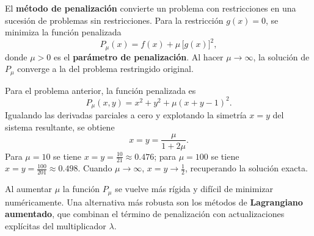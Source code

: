 \documentclass[a4,11pt]{aleph-notas}
\begin{document}
\begin{defi}
    El \textbf{método de penalización} convierte un problema con restricciones en una sucesión de problemas sin restricciones. Para la restricción $g({x})=0$, se minimiza la función penalizada
    \[
        P_\mu({x})=f({x})+\mu\,\bigl[g({x})\bigr]^2,
    \]
    donde $\mu>0$ es el \textbf{parámetro de penalización}. Al hacer $\mu\to\infty$, la solución de $P_\mu$ converge a la del problema restringido original.
\end{defi}

\begin{ejem}
    Para el problema anterior, la función penalizada es
    \[
        P_\mu(x,y)=x^2+y^2+\mu(x+y-1)^2.
    \]
    Igualando las derivadas parciales a cero y explotando la simetría $x=y$ del sistema resultante, se obtiene
    \[
        x = y = \frac{\mu}{1+2\mu}.
    \]
    Para $\mu=10$ se tiene $x=y=\tfrac{10}{21}\approx 0.476$; para $\mu=100$ se tiene $x=y=\tfrac{100}{201}\approx 0.498$. Cuando $\mu\to\infty$, $x=y\to\tfrac{1}{2}$, recuperando la solución exacta.
\end{ejem}

\begin{advertencia}
    Al aumentar $\mu$ la función $P_\mu$ se vuelve más rígida y difícil de minimizar numéricamente. Una alternativa más robusta son los métodos de \textbf{Lagrangiano aumentado}, que combinan el término de penalización con actualizaciones explícitas del multiplicador $\lambda$.
\end{advertencia}
\end{document}
